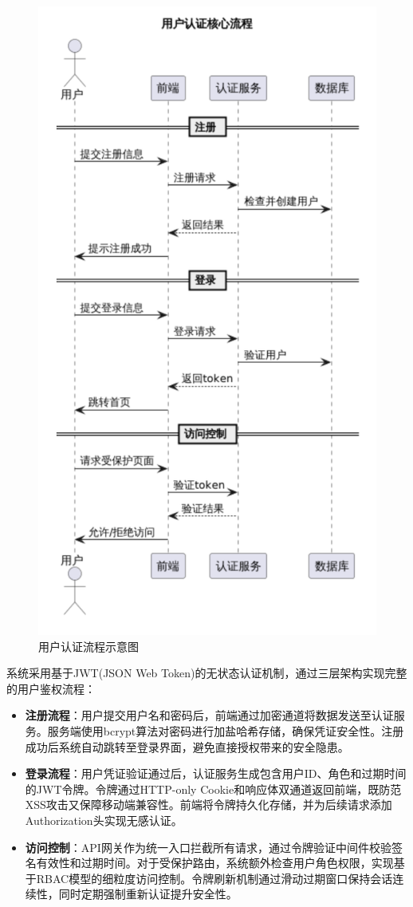 \documentclass{ctexart}
\begin{document}
\begin{figure}[H]
    \centering
    \includegraphics[width=0.5\linewidth]{./source/用户认证流程.png}
    \caption{用户认证流程示意图}
    \label{fig:auth-flow}
\end{figure}

系统采用基于JWT(JSON Web Token)的无状态认证机制，通过三层架构实现完整的用户鉴权流程：

\begin{itemize}
    \item \textbf{注册流程}：用户提交用户名和密码后，前端通过加密通道将数据发送至认证服务。服务端使用bcrypt算法对密码进行加盐哈希存储，确保凭证安全性。注册成功后系统自动跳转至登录界面，避免直接授权带来的安全隐患。

    \item \textbf{登录流程}：用户凭证验证通过后，认证服务生成包含用户ID、角色和过期时间的JWT令牌。令牌通过HTTP-only Cookie和响应体双通道返回前端，既防范XSS攻击又保障移动端兼容性。前端将令牌持久化存储，并为后续请求添加Authorization头实现无感认证。

    \item \textbf{访问控制}：API网关作为统一入口拦截所有请求，通过令牌验证中间件校验签名有效性和过期时间。对于受保护路由，系统额外检查用户角色权限，实现基于RBAC模型的细粒度访问控制。令牌刷新机制通过滑动过期窗口保持会话连续性，同时定期强制重新认证提升安全性。
\end{itemize}
\end{document}

